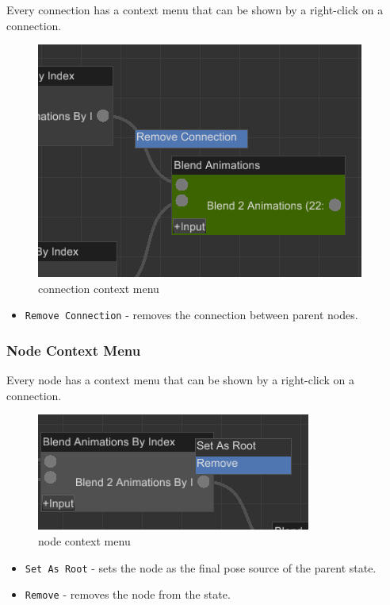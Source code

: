 \documentclass[
]{book}
\providecommand{\tightlist}{%
  \setlength{\itemsep}{0pt}\setlength{\parskip}{0pt}}
\theoremstyle{definition}
\theoremstyle{definition}
\theoremstyle{definition}
\theoremstyle{definition}
\theoremstyle{remark}
\begin{document}
Every connection has a context menu that can be shown by a right-click on a connection.

\begin{figure}
\centering
\includegraphics{images/animation/absm_connection_context_menu.png}
\caption{connection context menu}
\end{figure}

\begin{itemize}
\tightlist
\item
  \texttt{Remove\ Connection} - removes the connection between parent nodes.
\end{itemize}

\subsubsection{Node Context Menu}\label{node-context-menu}

Every node has a context menu that can be shown by a right-click on a connection.

\begin{figure}
\centering
\includegraphics{images/animation/absm_node_context_menu.png}
\caption{node context menu}
\end{figure}

\begin{itemize}
\tightlist
\item
  \texttt{Set\ As\ Root} - sets the node as the final pose source of the parent state.
\item
  \texttt{Remove} - removes the node from the state.
\end{itemize}
\end{document}
